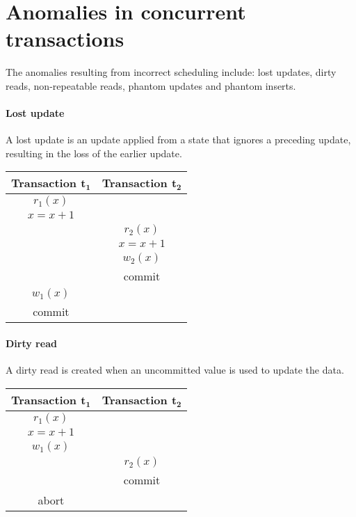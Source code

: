 \section{Anomalies in concurrent transactions}

The anomalies resulting from incorrect scheduling include: lost updates, dirty reads, non-repeatable reads, phantom updates and phantom inserts.

\paragraph*{Lost update}
A lost update is an update applied from a state that ignores a preceding update, resulting in the loss of the earlier update.
\begin{table}[H]
    \centering
    \begin{tabular}{c|c}
    \textbf{Transaction $\boldsymbol{t_1}$}    & \textbf{Transaction $\boldsymbol{t_2}$} \\ \hline
    $r_1(x)$                        &                            \\
    $x=x+1$                         &                            \\
                                    & $r_2(x)$                   \\
                                    & $x=x+1$                    \\
                                    & $w_2(x)$                   \\
                                    & commit                     \\
    $w_1(x)$                        &                            \\
    commit                          &                           
    \end{tabular}
\end{table}

\paragraph*{Dirty read}
A dirty read is created when an uncommitted value is used to update the data.
\begin{table}[H]
    \centering
    \begin{tabular}{c|c}
    \textbf{Transaction $\boldsymbol{t_1}$} & \textbf{Transaction $\boldsymbol{t_2}$} \\ \hline
    $r_1(x)$                   &                            \\
    $x=x+1$                    &                            \\
    $w_1(x)$                   &                            \\
                               & $r_2(x)$                   \\
                               & commit                     \\
    abort                      &                           
    \end{tabular}
\end{table}

